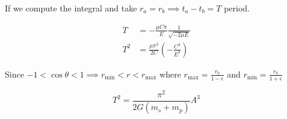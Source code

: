 If we compute the integral and take $r_a = r_b \implies t_a - t_b = T$ period.

\begin{align}
	T &= - \frac{\mu C \pi}{E} \frac{1}{\sqrt{-2\mu E}}\\
	T^2 &= \frac{\mu \pi^2}{2 C} \left(- \frac{C^3}{E^3}\right)
\end{align}

Since $-1 < \cos\theta < 1 \implies r_\mathrm{min} < r < r_\mathrm{max}$ where $r_\mathrm{max} = \frac{r_0}{1 - \epsilon}$ and $r_\mathrm{min} = \frac{r_0}{1 + \epsilon}$

\begin{equation}
	T^2 = \frac{\pi^2}{2G(m_s + m_p)} A^3
\end{equation}

